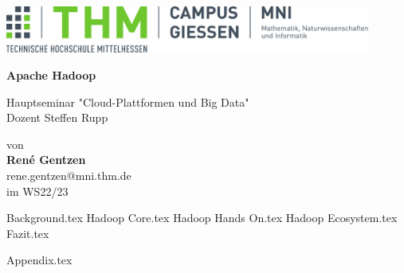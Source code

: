 \documentclass[%
	BCOR=8.25mm,         %
	DIV=12,              %
	parskip=half,		 %
	bibliography=totoc,	 %
	headsepline=on,      %
	12pt                 %
	]{scrbook}
\begin{document}
\frontmatter

\begin{titlepage}
	\begin{center}
	\includegraphics[width=0.9\textwidth]{mni-logo}
	
	\vspace{5cm}	

	\vspace{1cm}	

	\huge\textbf{\sffamily Apache Hadoop}

	\normalsize
	\vspace{1cm}	

	Hauptseminar "Cloud-Plattformen und Big Data" \\
	Dozent Steffen Rupp

	von \\[1cm]	

	\textbf{René Gentzen}\\ [.5cm] 
	rene.gentzen@mni.thm.de\\ [.5cm] 
	im WS22/23
	\end{center}
	\vfill
\end{titlepage}

\tableofcontents
\listoffigures

\mainmatter 
\pagestyle{headings}
{Background.tex}
{Hadoop Core.tex}
{Hadoop Hands On.tex}
{Hadoop Ecosystem.tex}
{Fazit.tex}



\backmatter 

\appendix
{Appendix.tex}
\printbibliography
\end{document}
